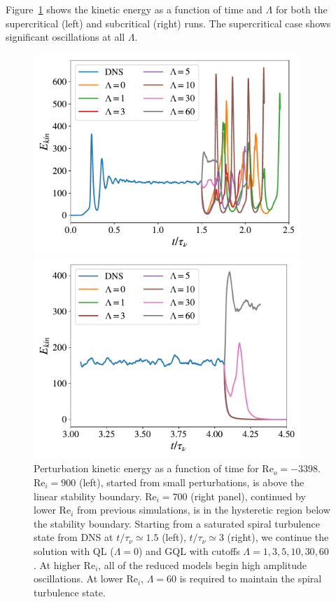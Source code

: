 \documentclass[openacc]{rstransa}%
\newcommand{\Reyn}{\mathrm{Re}}
\begin{document}
Figure~\ref{fig:ke_vs_t_rei900} shows the kinetic energy as a function of time and $\Lambda$ for both the supercritical (left) and subcritical (right) runs. 
The supercritical case shows significant oscillations at all $\Lambda$. 
\begin{figure}
    \centering
    \begin{minipage}{0.45\textwidth}
        \centering
        \includegraphics[width=0.9\textwidth]{figs/rei900_reo_-3398_KE_vs_t.pdf}
    \end{minipage}
    \begin{minipage}{0.45\textwidth}
        \centering
        \includegraphics[width=0.9\textwidth]{figs/rei700_reo_-3398_KE_vs_t.pdf}
    \end{minipage}
    \caption{Perturbation kinetic energy as a function of time for $\Reyn_o=-3398$. $\Reyn_i = 900$ (left), started from small perturbations, is above the linear stability boundary. $\Reyn_i = 700$ (right panel), continued by lower $\Reyn_i$ from previous simulations, is in the hysteretic region below the stability boundary. Starting from a saturated spiral turbulence state from DNS at $t/\tau_\nu \simeq 1.5$ (left), $t/\tau_\nu \simeq 3$ (right), we continue the solution with QL ($\Lambda = 0$) and GQL with cutoffs $\Lambda = 1,3,5,10,30,60$. At higher $\Reyn_i$, all of the reduced models begin high amplitude oscillations. At lower $\Reyn_i$, $\Lambda = 60$ is required to maintain the spiral turbulence state. }
    \label{fig:ke_vs_t_rei900}
\end{figure}
\end{document}
